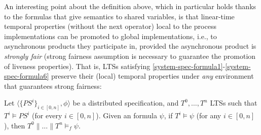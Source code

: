 An interesting point about the definition above, which in particular holds thanks to the formulas that give semantics to shared variables, is that linear-time temporal properties (without the next operator) local to the process implementations can be promoted to global implementations, i.e., to asynchronous products they participate in, provided the asynchronous product is \emph{strongly fair} (strong fairness assumption is necessary to guarantee the promotion of liveness properties). That is, LTSs satisfying \ref{system-spec-formula1}-\ref{system-spec-formula6} preserve their (local) temporal properties under \emph{any} environment that guarantees strong fairness:
\begin{theorem}\label{theorem:stuttering-equiv} Let $\langle \{ \mathit{PS}^i \}_{i \in [0,n]}, \phi \rangle$ be a distributed specification, and $T^0, \dots, T^n$ LTSs such that $T^i \vDash \mathit{PS}^i$ (for every $i \in [0,n]$). Given an {\LTLX} formula $\psi$, if $T^i \vDash \psi$  (for any $i \in [0,n]$), then $T^0 \parallel \dots \parallel T^n \vDash_f \psi$.
\end{theorem}
	
